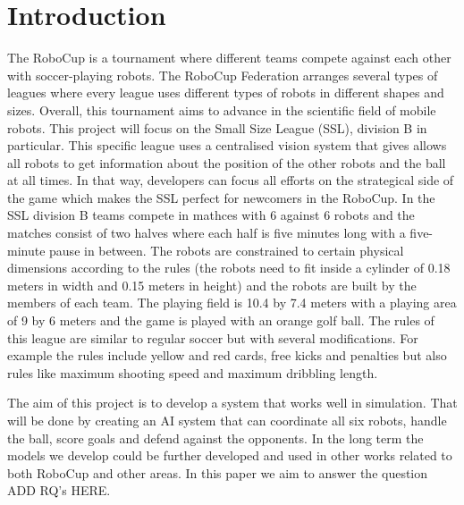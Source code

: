 \section{Introduction}
\label{section:intro}

The RoboCup \cite{RoboCupSSL} is a tournament where different teams 
compete against each other with soccer-playing robots. The RoboCup 
Federation arranges several types of leagues where every league uses 
different types of robots in different shapes and sizes. Overall, this 
tournament aims to advance in the scientific field of mobile robots. 
This project will focus on the Small Size League (SSL), division B in 
particular. This specific league uses a centralised vision system that 
gives allows all robots to get information about the position of the 
other robots and the ball at all times. In that way, developers can focus 
all efforts on the strategical side of the game which makes the SSL 
perfect for newcomers in the RoboCup. In the SSL division B teams 
compete in mathces with 6 against 6 robots and the matches consist of 
two halves where each half is five minutes long with a five-minute pause 
in between. The robots are constrained to certain physical dimensions 
according to the rules (the robots need to fit inside a cylinder of 
0.18 meters in width and 0.15 meters in height) and the robots are built 
by the members of each team. The playing field is 10.4 by 7.4 meters 
with a playing area of 9 by 6 meters and the game is played with an 
orange golf ball. The rules of this league are similar to regular soccer 
but with several modifications. For example the rules include yellow 
and red cards, free kicks and penalties but also rules like maximum 
shooting speed and maximum dribbling length. 

The aim of this project is to develop a system that works well in 
simulation. That will be done by creating an AI system that can 
coordinate all six robots, handle the ball, score goals and defend 
against the opponents. In the long term the models we develop could 
be further developed and used in other works related to both RoboCup 
and other areas. In this paper we aim to answer the question ADD RQ's HERE.

